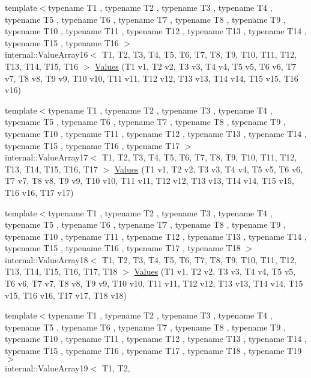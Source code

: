 \begin{DoxyCompactItemize}
{\footnotesize template$<$typename T1 , typename T2 , typename T3 , typename T4 , typename T5 , typename T6 , typename T7 , typename T8 , typename T9 , typename T10 , typename T11 , typename T12 , typename T13 , typename T14 , typename T15 , typename T16 $>$ }\\internal\-::\-Value\-Array16$<$ \-T1, \-T2, \*
\-T3, \-T4, \-T5, \-T6, \-T7, \-T8, \-T9, \*
\-T10, \-T11, \-T12, \-T13, \-T14, \-T15, \*
\-T16 $>$ \hyperlink{namespacetesting_afebcdc503d4a99cae5924523dcfd02e1}{\-Values} (\-T1 v1, \-T2 v2, \-T3 v3, \-T4 v4, \-T5 v5, \-T6 v6, \-T7 v7, \-T8 v8, \-T9 v9, \-T10 v10, \-T11 v11, \-T12 v12, \-T13 v13, \-T14 v14, \-T15 v15, \-T16 v16)
\item 
{\footnotesize template$<$typename T1 , typename T2 , typename T3 , typename T4 , typename T5 , typename T6 , typename T7 , typename T8 , typename T9 , typename T10 , typename T11 , typename T12 , typename T13 , typename T14 , typename T15 , typename T16 , typename T17 $>$ }\\internal\-::\-Value\-Array17$<$ \-T1, \-T2, \*
\-T3, \-T4, \-T5, \-T6, \-T7, \-T8, \-T9, \*
\-T10, \-T11, \-T12, \-T13, \-T14, \-T15, \*
\-T16, \-T17 $>$ \hyperlink{namespacetesting_a5cb89ee5c491cbe65de523f9f1bc1987}{\-Values} (\-T1 v1, \-T2 v2, \-T3 v3, \-T4 v4, \-T5 v5, \-T6 v6, \-T7 v7, \-T8 v8, \-T9 v9, \-T10 v10, \-T11 v11, \-T12 v12, \-T13 v13, \-T14 v14, \-T15 v15, \-T16 v16, \-T17 v17)
\item 
{\footnotesize template$<$typename T1 , typename T2 , typename T3 , typename T4 , typename T5 , typename T6 , typename T7 , typename T8 , typename T9 , typename T10 , typename T11 , typename T12 , typename T13 , typename T14 , typename T15 , typename T16 , typename T17 , typename T18 $>$ }\\internal\-::\-Value\-Array18$<$ \-T1, \-T2, \*
\-T3, \-T4, \-T5, \-T6, \-T7, \-T8, \-T9, \*
\-T10, \-T11, \-T12, \-T13, \-T14, \-T15, \*
\-T16, \-T17, \-T18 $>$ \hyperlink{namespacetesting_ab442a00c98b4bfb3bfa81f5e06bf53f9}{\-Values} (\-T1 v1, \-T2 v2, \-T3 v3, \-T4 v4, \-T5 v5, \-T6 v6, \-T7 v7, \-T8 v8, \-T9 v9, \-T10 v10, \-T11 v11, \-T12 v12, \-T13 v13, \-T14 v14, \-T15 v15, \-T16 v16, \-T17 v17, \-T18 v18)
\item 
{\footnotesize template$<$typename T1 , typename T2 , typename T3 , typename T4 , typename T5 , typename T6 , typename T7 , typename T8 , typename T9 , typename T10 , typename T11 , typename T12 , typename T13 , typename T14 , typename T15 , typename T16 , typename T17 , typename T18 , typename T19 $>$ }\\internal\-::\-Value\-Array19$<$ \-T1, \-T2, \*

\end{DoxyCompactItemize}
